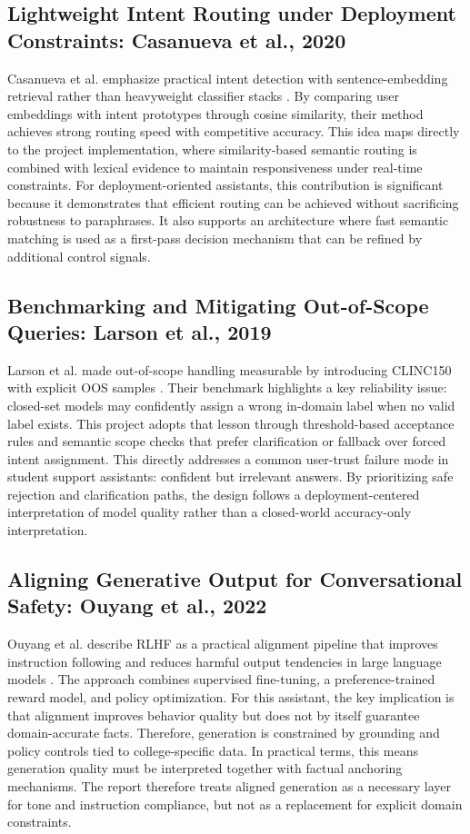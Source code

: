 \documentclass[12pt,onecolumn]{report}
\begin{document}
\subsection{Lightweight Intent Routing under Deployment Constraints: Casanueva et al., 2020}
Casanueva et al. emphasize practical intent detection with sentence-embedding retrieval rather than heavyweight classifier stacks \cite{casanueva2020banking77}. By comparing user embeddings with intent prototypes through cosine similarity, their method achieves strong routing speed with competitive accuracy. This idea maps directly to the project implementation, where similarity-based semantic routing is combined with lexical evidence to maintain responsiveness under real-time constraints.
For deployment-oriented assistants, this contribution is significant because it demonstrates that efficient routing can be achieved without sacrificing robustness to paraphrases. It also supports an architecture where fast semantic matching is used as a first-pass decision mechanism that can be refined by additional control signals.

\subsection{Benchmarking and Mitigating Out-of-Scope Queries: Larson et al., 2019}
Larson et al. made out-of-scope handling measurable by introducing CLINC150 with explicit OOS samples \cite{larson2019clinc150}. Their benchmark highlights a key reliability issue: closed-set models may confidently assign a wrong in-domain label when no valid label exists. This project adopts that lesson through threshold-based acceptance rules and semantic scope checks that prefer clarification or fallback over forced intent assignment.
This directly addresses a common user-trust failure mode in student support assistants: confident but irrelevant answers. By prioritizing safe rejection and clarification paths, the design follows a deployment-centered interpretation of model quality rather than a closed-world accuracy-only interpretation.

\subsection{Aligning Generative Output for Conversational Safety: Ouyang et al., 2022}
Ouyang et al. describe RLHF as a practical alignment pipeline that improves instruction following and reduces harmful output tendencies in large language models \cite{ouyang2022rlhf}. The approach combines supervised fine-tuning, a preference-trained reward model, and policy optimization. For this assistant, the key implication is that alignment improves behavior quality but does not by itself guarantee domain-accurate facts. Therefore, generation is constrained by grounding and policy controls tied to college-specific data.
In practical terms, this means generation quality must be interpreted together with factual anchoring mechanisms. The report therefore treats aligned generation as a necessary layer for tone and instruction compliance, but not as a replacement for explicit domain constraints.
\end{document}
